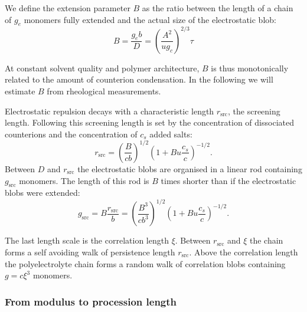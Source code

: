 \documentclass[journal=jacsat,manuscript=article]{achemso}
\begin{document}
We define the extension parameter $B$ as the ratio between the length of a chain of $g_e$ monomers fully extended and the actual size of the electrostatic blob: 
\begin{equation}
B = \frac{g_e b}{D} = \left(\frac{A^2}{u g_c}\right)^{2/3} \tau
\end{equation}

At constant solvent quality and polymer architecture, $B$ is thus monotonically related to the amount of counterion condensation. In the following we will estimate $B$ from rheological measurements.

Electrostatic repulsion decays with a characteristic length $r_\mathrm{src}$, the screening length. Following\cite{Rubinstein1996} this screening length is set by the concentration of dissociated counterions and the concentration of $c_s$ added salts:
\begin{equation}
r_\mathrm{src} = \left(\frac{B}{cb}\right)^{1/2} \left(1 + Bu \frac{c_s}{c}\right)^{-1/2}.
\end{equation}
Between $D$ and $r_\mathrm{src}$ the electrostatic blobs are organised in a linear rod containing $g_\mathrm{src}$ monomers. The length of this rod is $B$ times shorter than if the electrostatic blobs were extended: 
\begin{equation}
g_\mathrm{src} = B \frac{r_\mathrm{src}}{b} = \left(\frac{B^3}{cb^3}\right)^{1/2} \left(1 + Bu \frac{c_s}{c}\right)^{-1/2}.
\label{eq:gscr}
\end{equation}

The last length scale is the correlation length $\xi$. Between $r_\mathrm{src}$ and $\xi$ the chain forms a self avoiding walk of persistence length $r_\mathrm{src}$. Above the correlation length the polyelectrolyte chain forms a random walk of correlation blobs containing $g=c\xi^3$ monomers.

\subsubsection{From modulus to procession length}
\end{document}
